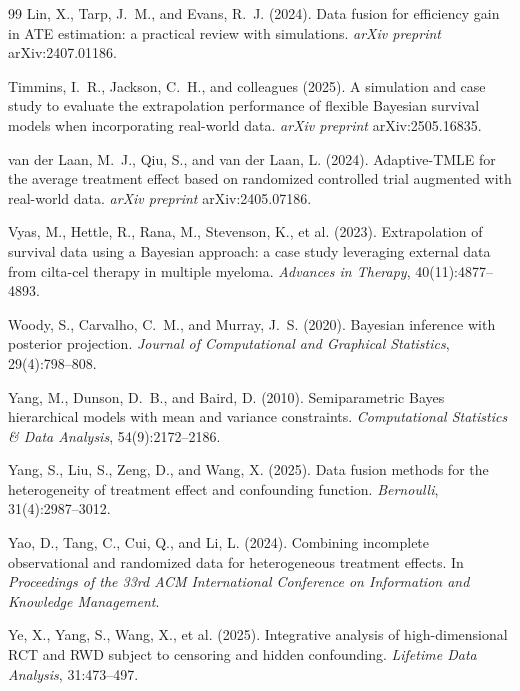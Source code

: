 \documentclass[11pt]{article}
\begin{document}
\begin{thebibliography}{99}
Lin, X., Tarp, J.~M., and Evans, R.~J. (2024).
\newblock Data fusion for efficiency gain in ATE estimation: a practical
review with simulations.
\newblock \emph{arXiv preprint} arXiv:2407.01186.

Timmins, I.~R., Jackson, C.~H., and colleagues (2025).
\newblock A simulation and case study to evaluate the extrapolation
performance of flexible Bayesian survival models when incorporating
real-world data.
\newblock \emph{arXiv preprint} arXiv:2505.16835.

van der Laan, M.~J., Qiu, S., and van der Laan, L. (2024).
\newblock Adaptive-TMLE for the average treatment effect based on
randomized controlled trial augmented with real-world data.
\newblock \emph{arXiv preprint} arXiv:2405.07186.

Vyas, M., Hettle, R., Rana, M., Stevenson, K., et al. (2023).
\newblock Extrapolation of survival data using a Bayesian approach: a case
study leveraging external data from cilta-cel therapy in multiple myeloma.
\newblock \emph{Advances in Therapy}, 40(11):4877--4893.

Woody, S., Carvalho, C.~M., and Murray, J.~S. (2020).
\newblock Bayesian inference with posterior projection.
\newblock \emph{Journal of Computational and Graphical Statistics},
29(4):798--808.

Yang, M., Dunson, D.~B., and Baird, D. (2010).
\newblock Semiparametric Bayes hierarchical models with mean and variance
constraints.
\newblock \emph{Computational Statistics \& Data Analysis},
54(9):2172--2186.

Yang, S., Liu, S., Zeng, D., and Wang, X. (2025).
\newblock Data fusion methods for the heterogeneity of treatment effect and
confounding function.
\newblock \emph{Bernoulli}, 31(4):2987--3012.

Yao, D., Tang, C., Cui, Q., and Li, L. (2024).
\newblock Combining incomplete observational and randomized data for
heterogeneous treatment effects.
\newblock In \emph{Proceedings of the 33rd ACM International Conference
on Information and Knowledge Management}.

Ye, X., Yang, S., Wang, X., et al. (2025).
\newblock Integrative analysis of high-dimensional RCT and RWD subject to
censoring and hidden confounding.
\newblock \emph{Lifetime Data Analysis}, 31:473--497.

\end{thebibliography}
\end{document}
